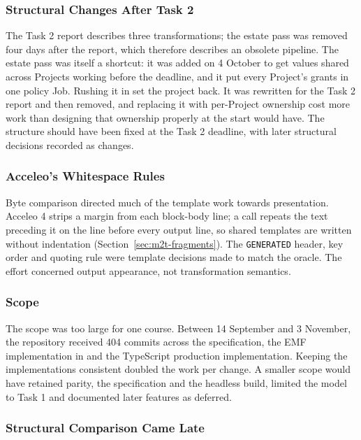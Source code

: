 \subsubsection{Structural Changes After Task 2}
\label{sec:late-structure}

The Task 2 report describes three transformations; the estate pass was removed
four days after the report, which therefore describes an obsolete pipeline. The estate
pass was itself a shortcut: it was added on 4 October to get values shared across
Projects working before the deadline, and it put every Project's grants in one policy
Job. Rushing it in set the project back. It was rewritten for the Task 2 report and
then removed, and replacing it with per-Project ownership cost more work than
designing that ownership properly at the start would have. The structure should have
been fixed at the Task 2 deadline, with later structural decisions recorded as changes.

\subsubsection{Acceleo's Whitespace Rules}
\label{sec:whitespace}

Byte comparison directed much of the template work towards presentation. Acceleo 4 strips
a margin from each block-body line; a call repeats the text preceding it on the
line before every output line, so shared templates are written without
indentation (Section~\ref{sec:m2t-fragments}). The \texttt{GENERATED} header, key order
and quoting rule were template decisions made to match the oracle. The effort
concerned output appearance, not transformation semantics.

\subsubsection{Scope}
\label{sec:scope}

The scope was too large for one course. Between 14 September and 3 November, the
repository received 404 commits across the specification, the EMF
implementation in  and the TypeScript production implementation.
Keeping the implementations consistent doubled the work per change. A smaller scope would
have retained parity, the specification and the headless build, limited the model to
Task 1 and documented later features as deferred.

\subsubsection{Structural Comparison Came Late}
\label{sec:byte-cost}

